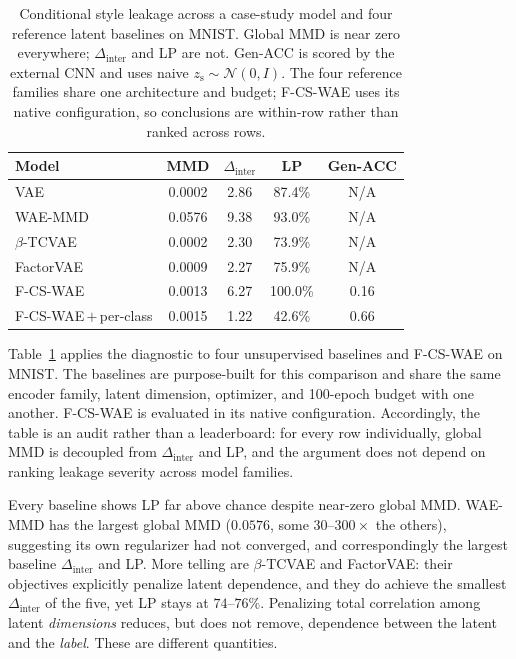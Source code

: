 \documentclass[letterpaper]{article}
\newcommand{\ours}{F-CS-WAE}
\newcommand{\zs}{z_{\mathrm{s}}}
\newcommand{\Dinter}{\Delta_{\mathrm{inter}}}
\begin{document}
\begin{table}[t]
\centering
\small
\setlength{\tabcolsep}{4pt}
\caption{Conditional style leakage across a case-study model and four
reference latent baselines on MNIST.
Global MMD is near zero everywhere; $\Dinter$ and LP are not. Gen-ACC is
scored by the external CNN and uses naive $\zs\sim\mathcal N(0,I)$.
The four reference families share one architecture and budget; \ours{} uses
its native configuration, so conclusions are within-row rather than ranked
across rows.}
\label{tab:cross}
\begin{tabular}{lcccc}
\toprule
Model & MMD & $\Dinter$ & LP & Gen-ACC \\
\midrule
VAE           & 0.0002 & 2.86 & 87.4\% & N/A \\
WAE-MMD       & 0.0576 & 9.38 & 93.0\% & N/A \\
$\beta$-TCVAE & 0.0002 & 2.30 & 73.9\% & N/A \\
FactorVAE     & 0.0009 & 2.27 & 75.9\% & N/A \\
\ours{}       & 0.0013 & 6.27 & 100.0\% & 0.16 \\
\midrule
\ours{}\,$+$\,per-class & 0.0015 & 1.22 & 42.6\% &
0.66 \\
\bottomrule
\end{tabular}
\end{table}

Table~\ref{tab:cross} applies the diagnostic to four unsupervised baselines
and \ours{} on MNIST. The baselines are purpose-built for this comparison
and share the same encoder family, latent dimension, optimizer, and
100-epoch budget with one another. \ours{} is evaluated in its native
configuration. Accordingly, the table is an audit rather than a leaderboard:
for every row individually, global MMD is decoupled from $\Dinter$ and LP,
and the argument does not depend on ranking leakage severity across model
families.

Every baseline shows LP far above chance despite near-zero global MMD.
WAE-MMD has the largest global MMD ($0.0576$, some $30$--$300\times$ the
others), suggesting its own regularizer had not converged, and correspondingly
the largest baseline $\Dinter$ and LP. More telling are $\beta$-TCVAE and
FactorVAE: their objectives explicitly penalize latent dependence, and they
do achieve the smallest $\Dinter$ of the five, yet LP stays at $74$--$76\%$.
Penalizing total correlation among latent \emph{dimensions} reduces, but does
not remove, dependence between the latent and the \emph{label}. These are
different quantities.
\end{document}

